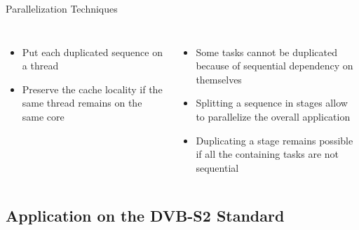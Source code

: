 \begin{frame}{Parallelization Techniques}
\begin{columns}
\begin{column}[T]{6cm}
\begin{figure}[!h]
{
      }
    \end{figure}
    \end{column}
  \end{columns}

  \vspace{0.3cm}
  \begin{columns}
    \begin{column}[T]{6cm}
      \begin{itemize}
        \item Put each duplicated sequence on a thread
        \item Preserve the cache locality if the same thread remains on the same core
      \end{itemize}
    \end{column}
    \begin{column}[T]{6cm}
      \begin{itemize}
        \item Some tasks cannot be duplicated because of sequential dependency on themselves
        \item Splitting a sequence in stages allow to parallelize the overall application
        \item Duplicating a stage remains possible if all the containing tasks are not sequential
      \end{itemize}
    \end{column}
  \end{columns}

\end{frame}

\subsection[DVB-S2 Standard]{Application on the DVB-S2 Standard}

